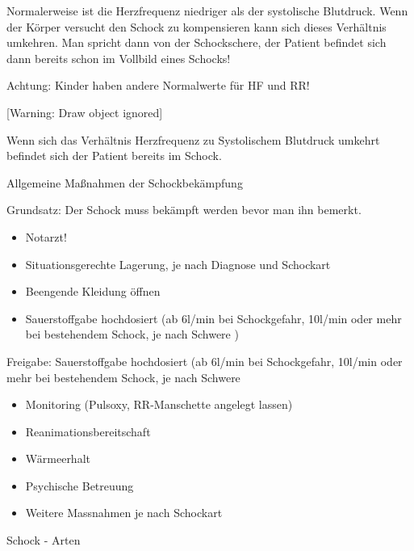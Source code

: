 \documentclass{article}
\begin{document}
Normalerweise ist die Herzfrequenz niedriger als der systolische
Blutdruck. Wenn der K\"orper versucht den Schock zu kompensieren kann
sich dieses Verh\"altnis umkehren. Man spricht dann von der
Schockschere, der Patient befindet sich dann bereits schon im Vollbild
eines Schocks! 

Achtung: Kinder haben andere Normalwerte f\"ur HF und RR!

[Warning: Draw object ignored]

Wenn sich das Verh\"altnis Herzfrequenz zu Systolischem Blutdruck
umkehrt befindet sich der Patient bereits im Schock. 

\label{bkm:RefHeading38104902}Allgemeine Ma{\ss}nahmen der
Schockbek\"ampfung

Grundsatz: Der Schock muss bek\"ampft werden bevor man ihn bemerkt.

\begin{itemize}
\item Notarzt!

\item Situationsgerechte  Lagerung, je nach Diagnose und Schockart

\item Beengende Kleidung \"offnen

\item Sauerstoffgabe hochdosiert (ab 6l/min bei Schockgefahr, 10l/min
oder mehr bei bestehendem Schock, je nach Schwere%
%
)

\end{itemize}
Freigabe: Sauerstoffgabe hochdosiert (ab 6l/min bei Schockgefahr,
10l/min oder mehr bei bestehendem Schock, je nach Schwere

\begin{itemize}
\item Monitoring (Pulsoxy, RR-Manschette angelegt lassen)

\item Reanimationsbereitschaft 

\item W\"armeerhalt

\item Psychische Betreuung

\item Weitere Massnahmen je nach Schockart 

\end{itemize}
Schock - Arten
\end{document}
